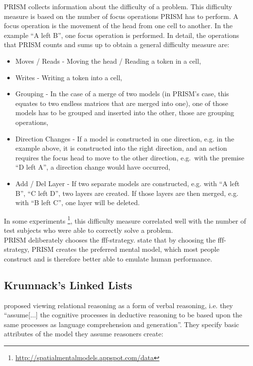 \documentclass[hidelinks]{scrartcl}
\begin{document}
PRISM collects information about the difficulty of a problem. This difficulty measure is based on the number of focus operations PRISM has to perform. A focus operation is the movement of the head from one cell to another. In the example ``A left B'', one focus operation is performed. In detail, the operations that PRISM counts and sums up to obtain a general difficulty measure are:

\begin{itemize}
\item Moves / Reads - Moving the head / Reading a \gls{token} in a cell,
\item Writes - Writing a \gls{token} into a cell,
\item Grouping - In the case of a merge of two models (in PRISM's case, this equates to two endless matrices that are merged into one), one of those models has to be grouped and inserted into the other, those are grouping operations,
\item Direction Changes - If a model is constructed in one direction, e.g. in the example above, it is constructed into the right direction, and an action requires the focus head to move to the other direction, e.g.\ with the \gls{premise} ``D left A'', a direction change would have occurred,
\item Add / Del Layer - If two separate models are constructed, e.g. with ``A left B'', ``C left D'', two layers are created. If those layers are then merged, e.g. with ``B left C'', one layer will be deleted.
\end{itemize}

In some experiments \footnote{\url{http://spatialmentalmodels.appspot.com/data}}, this difficulty measure correlated well with the number of test subjects who were able to correctly solve a problem. \\

PRISM deliberately chooses the fff-strategy. \cite{Ragni.2013} state that by choosing the fff-strategy, PRISM creates the preferred mental model, which most people construct and is therefore better able to emulate human performance.

\subsection{Krumnack's Linked Lists}
\cite*{Krumnack.2011} proposed viewing relational reasoning as a form of verbal reasoning, i.e. they ``assume[...] the cognitive processes in deductive reasoning to be based upon the same processes as language comprehension and generation''. They specify basic attributes of the model they assume reasoners create:
\end{document}
